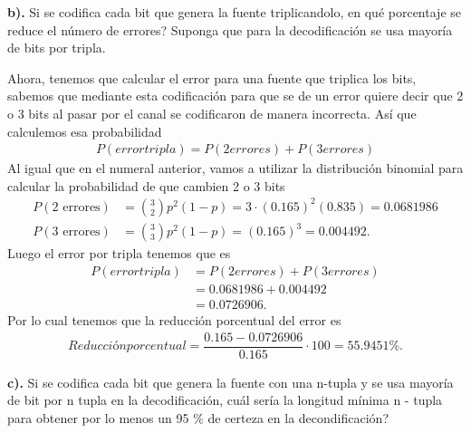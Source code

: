 \textbf{b).} Si se codifica cada bit que genera la fuente triplicandolo, en qué porcentaje se reduce el número de errores? Suponga que para la decodificación se usa mayoría de bits por tripla.\\
\begin{sol}
   Ahora, tenemos que calcular el error para una fuente que triplica los bits, sabemos que mediante esta codificación para que se de un error quiere decir que 2 o 3 bits al pasar por el canal se codificaron de manera incorrecta. Así que calculemos esa probabilidad
   \begin{align*}
    P(errortripla)=P(2errores)+P(3errores)
    \end{align*}
    Al igual que en el numeral anterior, vamos a utilizar la  distribución binomial para calcular la probabilidad de que cambien 2 o 3 bits
    \begin{align*}
    P(\text{2 errores})&= \binom{3}{2} p^2 (1-p)=3\cdot (0.165)^{2}(0.835)=0.0681986\\
    P(\text{3 errores})&= \binom{3}{3} p^2 (1-p)= (0.165)^{3}=0.004492
    .\end{align*}
Luego el error por tripla tenemos que es 
\begin{align*}
    P(errortripla)&=P(2errores)+P(3errores)\\
    &=0.0681986+0.004492\\
    &=0.0726906
.\end{align*}   
Por lo cual tenemos que la reducción porcentual del error es
\begin{align*}
   Reducción porcentual=\dfrac{0.165-0.0726906}{0.165}\cdot 100=55.9451\%
.\end{align*}
\end{sol}
\textbf{c).} Si se codifica cada bit que genera la fuente con una n-tupla y se usa mayoría de bit por n tupla en la decodificación, cuál sería la longitud
mínima n - tupla para obtener por lo menos un 95 $\%$ de certeza en la decondificación?
